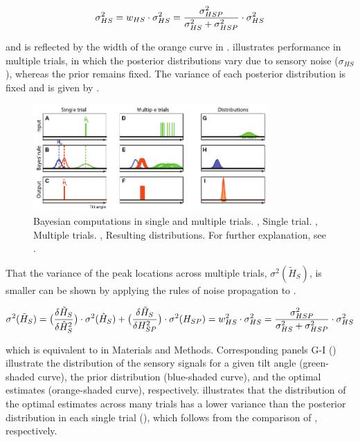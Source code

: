 \begin{equation}
\label{p1:eqn16}
\sigma^2_{HS} = w_{HS} \cdot \sigma^2_{HS} \\
              = \frac{\sigma^2_{HSP}}{\sigma^2_{HS} + \sigma^2_{HSP}} \cdot \sigma^2_{HS}
\end{equation}

and is reflected by the width of the orange curve in .  illustrates performance in multiple trials, in which the posterior distributions vary due to sensory noise ($\sigma_{HS}$), whereas the prior remains fixed. The variance of each posterior distribution is fixed and is given by .

\begin{figure}
    \includegraphics[width=0.80\textwidth]{src/paper1/figure8.pdf}
    \caption{Bayesian computations in single and multiple trials. , Single trial. , Multiple trials. , Resulting distributions. For further explanation, see .}
    \label{p1:fig8}
\end{figure}

That the variance of the peak locations across multiple trials, $\sigma^2(\tilde{H}_S)$, is smaller can be shown by applying the rules of noise propagation to .

\begin{equation}
\label{p1:eqn17}
\sigma^2(\tilde{H}_S) = \\
	\big( \frac{\delta\tilde{H}_S}{\delta\hat{H}_S^2} \big) \cdot \\
	\sigma^2(\hat{H}_S) + \\
	\big( \frac{\delta\tilde{H}_S}{\delta H_{SP}^2} \big) \cdot \\
	\sigma^2(H_{SP}) \\
	= w^2_{HS} \cdot \sigma^2_{HS} \\
	= \frac{\sigma^2_{HSP}}{\sigma^2_{HS} + \sigma^2_{HSP}} \cdot \sigma^2_{HS}
\end{equation}

which is equivalent to  in Materials and Methods. Corresponding panels G-I () illustrate the distribution of the sensory signals for a given tilt angle (green-shaded curve), the prior distribution (blue-shaded curve), and the optimal estimates (orange-shaded curve), respectively.  illustrates that the distribution of the optimal estimates across many trials has a lower variance than the posterior distribution in each single trial (), which follows from the comparison of , respectively.
